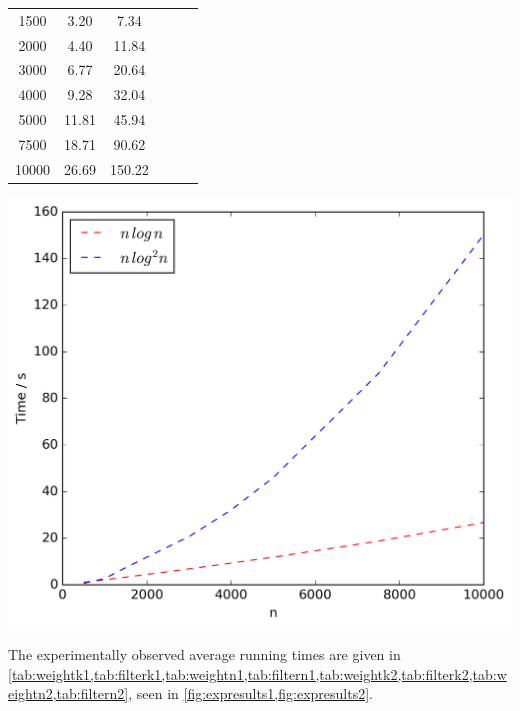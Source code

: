 \documentclass[final,1p,times]{elsarticle}
\begin{document}
\begin{table}[!ht]
\begin{minipage}{0.48\textwidth}
\begin{tabular}{c||ccccc}
                1500 & 3.20 & 7.34\\
                2000 & 4.40 & 11.84\\
                3000 & 6.77 & 20.64\\
                4000 & 9.28 & 32.04\\
                5000 & 11.81 & 45.94\\
                7500 & 18.71 & 90.62\\
                10000 & 26.69 & 150.22\\
            \end{tabular}
            \includegraphics[scale=0.4]{varyingn2_filter}
        \end{minipage}
        \label{fig:expresults2}
    \end{table}

    The experimentally observed average running times are given in \cref{tab:weightk1,tab:filterk1,tab:weightn1,tab:filtern1,tab:weightk2,tab:filterk2,tab:weightn2,tab:filtern2}, seen in \cref{fig:expresults1,fig:expresults2}.
\end{document}
